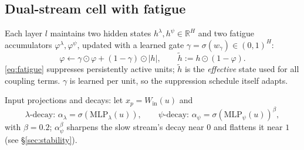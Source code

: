 \documentclass[11pt]{article}
\begin{document}
\subsection{Dual-stream cell with fatigue}\label{sec:cell}
Each layer $l$ maintains two hidden states $h^\lambda, h^\psi \in
\mathbb{R}^{H}$ and two fatigue accumulators $\varphi^\lambda, \varphi^\psi$,
updated with a learned gate $\gamma = \sigma(w_\gamma) \in (0,1)^H$:
\begin{equation}\label{eq:fatigue}
\varphi \leftarrow \gamma \odot \varphi + (1-\gamma)\odot |h|, \qquad
\widetilde h := h \odot (1-\varphi).
\end{equation}
\eqref{eq:fatigue} suppresses persistently active units; $\widetilde h$ is
the \emph{effective} state used for all coupling terms. $\gamma$ is learned
per unit, so the suppression schedule itself adapts.

Input projections and decays: let $x_p = W_{\mathrm{in}}(u)$ and
\begin{equation}\label{eq:decays}
\lambda\text{-decay: } \alpha_\lambda = \sigma(\mathrm{MLP}_\lambda(u)), \qquad
\psi\text{-decay: } \alpha_\psi = \sigma(\mathrm{MLP}_\psi(u))^{\beta},
\end{equation}
with $\beta = 0.2$; $\alpha_\psi^{\beta}$ sharpens the slow stream's decay
near $0$ and flattens it near $1$ (see \S\ref{sec:stability}).
\end{document}
